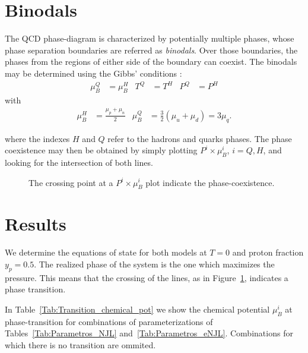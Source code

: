 \documentclass{ws-ijmpcs}
\begin{document}
\section{Binodals}

The QCD phase-diagram is characterized by potentially multiple phases, whose phase separation boundaries are referred as \emph{binodals}. Over those boundaries, the phases from the regions of either side of the boundary can coexist. The binodals may be determined using the Gibbs' conditions \cite{Cavagnoli2011}:
\begin{align}
\mu_B^Q &= \mu_B^H & T^Q &= T^H & P^Q &= P^H
\end{align}
%
with
\begin{align*}
\mu_B^H &= \frac{\mu_p + \mu_n}{2} & 	\mu_B^Q &= \frac{3}{2} (\mu_u + \mu_d) = 3 \mu_q.
\end{align*}

\noindent{}where the indexes $H$ and $Q$ refer to the hadrons and quarks phases. The phase coexistence may then be obtained by simply plotting $P^i \times \mu_B^i$, $i = Q, H$, and looking for the intersection of both lines.


\begin{figure}[!ht]
\centering
\caption{The crossing point at a $P^i \times \mu_B^i$ plot indicate the phase-coexistence.\label{Fig:Pressure_func_chemical_pot}}

\end{figure}

\section{Results}

We determine the equations of state for both models at $T = 0$ and proton fraction $y_p = 0.5$. The realized phase of the system is the one which maximizes the pressure. This means that the crossing of the lines, as in Figure~\ref{Fig:Pressure_func_chemical_pot}, indicates a phase transition.

In Table~\ref{Tab:Transition_chemical_pot} we show the chemical potential $\mu_B^i$ at phase-transition for combinations of parameterizations of Tables~\ref{Tab:Parametros_NJL} and~\ref{Tab:Parametros_eNJL}. Combinations for which there is no transition are ommited.
\end{document}

